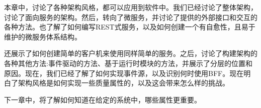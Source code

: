 本章中，讨论了各种架构风格，都可以应用到软件中。我们已经讨论了整体架构，讨论了面向服务的架构。然后，转向了微服务，并讨论了提供的外部接口和交互的各种方法。也了解了如何编写REST式服务，以及如何创建一个有自愈性，且易于维护的微服务体系结构。

还展示了如何创建简单的客户机来使用同样简单的服务。之后，讨论了构建架构的各种其他方法:事件驱动的方法、基于运行时模块的方法，并展示了分层的位置和原因。现在，我们已经了解了如何实现事件源，以及识别何时使用BFF。现在明白了架构风格是如何实现一些质量属性的，以及这会带来怎么样的挑战。

下一章中，将了解如何知道在给定的系统中，哪些属性更重要。


